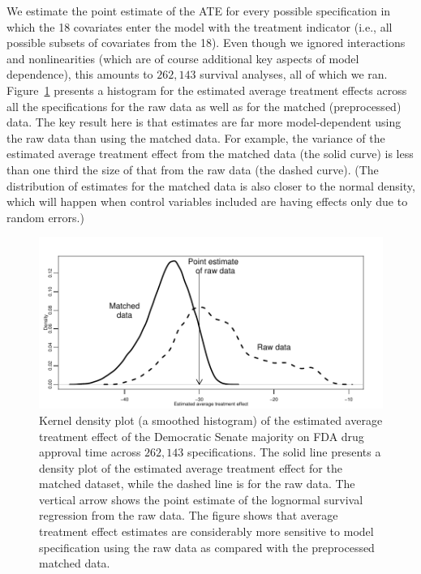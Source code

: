 \documentclass[11pt,titlepage]{article}
\begin{document}
We estimate the point estimate of the ATE for every possible
specification in which the 18 covariates enter the model with the
treatment indicator (i.e., all possible subsets of covariates from the
18).  Even though we ignored interactions and nonlinearities (which
are of course additional key aspects of model dependence), this
amounts to $262,143$ survival analyses, all of which we ran.
Figure~\ref{fg:fdadens} presents a histogram for the estimated average
treatment effects across all the specifications for the raw data as
well as for the matched (preprocessed) data.  The key result here is
that estimates are far more model-dependent using the raw data than
using the matched data.  For example, the variance of the estimated
average treatment effect from the matched data (the solid curve) is
less than one third the size of that from the raw data (the dashed
curve).  (The distribution of estimates for the matched data is also
closer to the normal density, which will happen when control variables
included are having effects only due to random errors.)
\begin{figure}[t] 
 \begin{center}
   \includegraphics{figs/fdadens.pdf}
  \end{center}
  \vspace{-0.275in}
  \caption{Kernel density plot (a smoothed histogram)
    of the estimated average treatment effect of the Democratic Senate
    majority on FDA drug approval time across $262,143$
    specifications. The solid line presents a density plot of the
    estimated average treatment effect for the matched dataset, while
    the dashed line is for the raw data.  The vertical arrow shows the
    point estimate of the lognormal survival regression from the raw
    data.  The figure shows that average treatment effect estimates
    are considerably more sensitive to model specification using the
    raw data as compared with the preprocessed matched data.}
  \label{fg:fdadens}
\end{figure}
\end{document}
